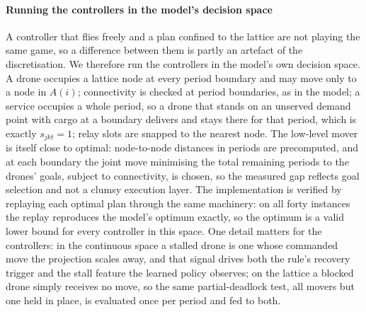 \documentclass[final,5p,times,twocolumn]{elsarticle}
\begin{document}
\paragraph{Running the controllers in the model's decision space}
A controller that flies freely and a plan confined to the lattice are not playing the same game,
so a difference between them is partly an artefact of the discretisation. We therefore run the
controllers in the model's own decision space. A drone occupies a lattice node at every period
boundary and may move only to a node in $A(i)$; connectivity is checked at period boundaries, as
in the model; a service occupies a whole period, so a drone that stands on an unserved demand
point with cargo at a boundary delivers and stays there for that period, which is exactly
$s_{jkt}=1$; relay slots are snapped to the nearest node. The low-level mover is itself close to
optimal: node-to-node distances in periods are precomputed, and at each boundary the joint move
minimising the total remaining periods to the drones' goals, subject to connectivity, is chosen,
so the measured gap reflects goal selection and not a clumsy execution layer. The implementation
is verified by replaying each optimal plan through the same machinery: on all forty instances the
replay reproduces the model's optimum exactly, so the optimum is a valid lower bound for every
controller in this space. One detail matters for the controllers: in the continuous space a
stalled drone is one whose commanded move the projection scales away, and that signal drives both
the rule's recovery trigger and the stall feature the learned policy observes; on the lattice a
blocked drone simply receives no move, so the same partial-deadlock test, all movers but one held
in place, is evaluated once per period and fed to both.
\end{document}
